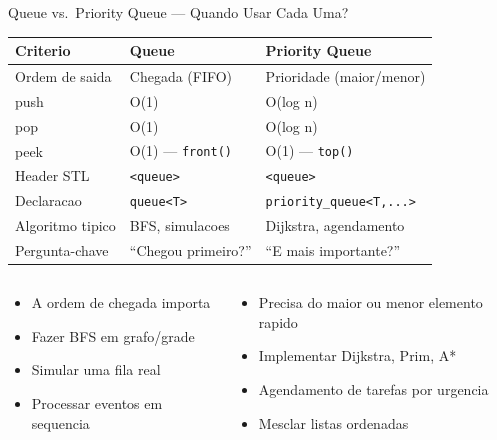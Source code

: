 \documentclass[aspectratio=169,11pt]{beamer}
\begin{document}
\begin{frame}{Queue vs.\ Priority Queue --- Quando Usar Cada Uma?}
  \begin{tcolorbox}[caixaAzul,title={Tabela Comparativa Completa}]
    \centering\small
    \begin{tabular}{lll}
      \toprule
      \textbf{Criterio} & \textbf{Queue} & \textbf{Priority Queue}\\
      \midrule
      Ordem de saida & Chegada (FIFO) & Prioridade (maior/menor)\\
      push           & O(1) & O(log n)\\
      pop            & O(1) & O(log n)\\
      peek           & O(1) --- \texttt{front()} & O(1) --- \texttt{top()}\\
      Header STL     & \texttt{<queue>} & \texttt{<queue>}\\
      Declaracao     & \texttt{queue<T>} & \texttt{priority\_queue<T,...>}\\
      \midrule
      Algoritmo tipico & BFS, simulacoes & Dijkstra, agendamento\\
      Pergunta-chave & ``Chegou primeiro?'' & ``E mais importante?''\\
      \bottomrule
    \end{tabular}
  \end{tcolorbox}
  \vspace{0.15cm}
  \begin{columns}[t]
      \begin{tcolorbox}[caixaLaranja,title={Use Queue quando...}]
        \begin{itemize}\small
          \item A ordem de chegada importa
          \item Fazer BFS em grafo/grade
          \item Simular uma fila real
          \item Processar eventos em sequencia
        \end{itemize}
      \end{tcolorbox}
      \begin{tcolorbox}[caixaRoxa,title={Use Priority Queue quando...}]
        \begin{itemize}\small
          \item Precisa do maior ou menor elemento rapido
          \item Implementar Dijkstra, Prim, A*
          \item Agendamento de tarefas por urgencia
          \item Mesclar listas ordenadas
        \end{itemize}
      \end{tcolorbox}
  \end{columns}
\end{frame}
\end{document}

